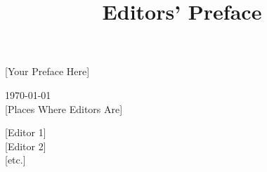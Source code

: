 \documentclass{dhbenelux}
\title{Editors' Preface}
\author{}
\begin{document}
\maketitle

\thispagestyle{papertitlepage} 

\section*{}
[Your Preface Here]

\bigskip

\noindent
\begin{minipage}[t]{.4\textwidth}
\today\\ {[Places Where Editors Are]}
\end{minipage}%
\hfill
\begin{minipage}[t]{.4\textwidth}\flushright
{[Editor 1]} \\
{[Editor 2]} \\
{[etc.]}
\end{minipage}

\newpage\null\thispagestyle{empty}\newpage
\end{document}
